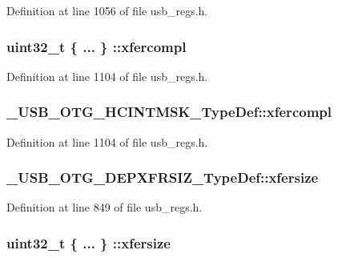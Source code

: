 Definition at line 1056 of file usb\-\_\-regs.\-h.

\hypertarget{group___u_s_b___o_t_g___d_r_i_v_e_r_ga80d48b35bb2c8eb18c39a70e8276d1c9}{
\subsubsection[{xfercompl}]{\setlength{\rightskip}{0pt plus 5cm}uint32\-\_\-t \{ ... \} \-::xfercompl}}\label{group___u_s_b___o_t_g___d_r_i_v_e_r_ga80d48b35bb2c8eb18c39a70e8276d1c9}


Definition at line 1104 of file usb\-\_\-regs.\-h.

\hypertarget{group___u_s_b___o_t_g___d_r_i_v_e_r_ga14412b191b38e4a7eb8f260ef7613fde}{
\subsubsection[{xfercompl}]{ \-\_\-\-U\-S\-B\-\_\-\-O\-T\-G\-\_\-\-H\-C\-I\-N\-T\-M\-S\-K\-\_\-\-Type\-Def\-::xfercompl}}\label{group___u_s_b___o_t_g___d_r_i_v_e_r_ga14412b191b38e4a7eb8f260ef7613fde}


Definition at line 1104 of file usb\-\_\-regs.\-h.

\hypertarget{group___u_s_b___o_t_g___d_r_i_v_e_r_gacbb83610c76a02a5b5b6eb6660030456}{
\subsubsection[{xfersize}]{ \-\_\-\-U\-S\-B\-\_\-\-O\-T\-G\-\_\-\-D\-E\-P\-X\-F\-R\-S\-I\-Z\-\_\-\-Type\-Def\-::xfersize}}\label{group___u_s_b___o_t_g___d_r_i_v_e_r_gacbb83610c76a02a5b5b6eb6660030456}


Definition at line 849 of file usb\-\_\-regs.\-h.

\hypertarget{group___u_s_b___o_t_g___d_r_i_v_e_r_gae788c8fc18693e681f3cd4b9ba33025e}{
\subsubsection[{xfersize}]{\setlength{\rightskip}{0pt plus 5cm}uint32\-\_\-t \{ ... \} \-::xfersize}}\label{group___u_s_b___o_t_g___d_r_i_v_e_r_gae788c8fc18693e681f3cd4b9ba33025e}


